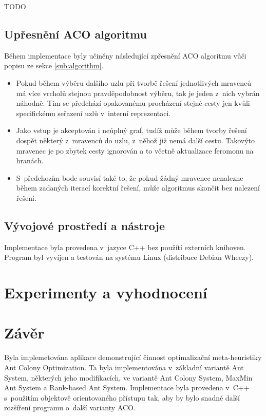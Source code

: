 \documentclass[a4paper, 12pt]{article}
\begin{document}
TODO
\subsection{Upřesnění ACO algoritmu}
Během implementace byly učiněny následující zpřesnění ACO algoritmu vůči popisu ze sekce \ref{sub:algorithm}.
\begin{itemize}
  \item Pokud během výběru dalšího uzlu při tvorbě řešení jednotlivých mravenců má více vrcholů stejnou pravděpodobnost výběru, tak je jeden z~nich vybrán náhodně.
  Tím se předchází opakovanému procházení stejné cesty jen kvůli specifickému seřazení uzlů v~interní reprezentaci.
  \item Jako vstup je akceptován i neúplný graf, tudíž může během tvorby řešení dospět některý z~mravenců do uzlu, z~něhož již nemá další cestu. Takovýto mravenec
  je po zbytek cesty ignorován a to včetně aktualizace feromonu na hranách.
  \item S~předchozím bode souvisí také to, že pokud žádný mravenec nenalezne během zadaných iterací korektní řešení, může algoritmus skončit bez nalezení
  řešení.
\end{itemize}

\subsection{Vývojové prostředí a nástroje}
Implementace byla provedena v~jazyce C++ bez použítí externích knihoven. Program byl vyvíjen a testován na systému Linux (distribuce Debian Wheezy).

\section{Experimenty a vyhodnocení}
\label{sec:eval}

\section{Závěr}
\label{sec:concl}
Byla implemetována aplikace demonstrující činnost optimalizační meta-heuristiky Ant Colony Optimization. 
Ta byla implementována v~základní variantě Ant System, některých
jeho modifikacích, ve variantě Ant Colony System, MaxMin Ant System a Rank-based Ant System. Implementace byla provedena v~C++ s~použitím objektově orientovaného
přístupu tak, aby by bylo snadné další rozšíření programu o~další varianty ACO.
\end{document}
